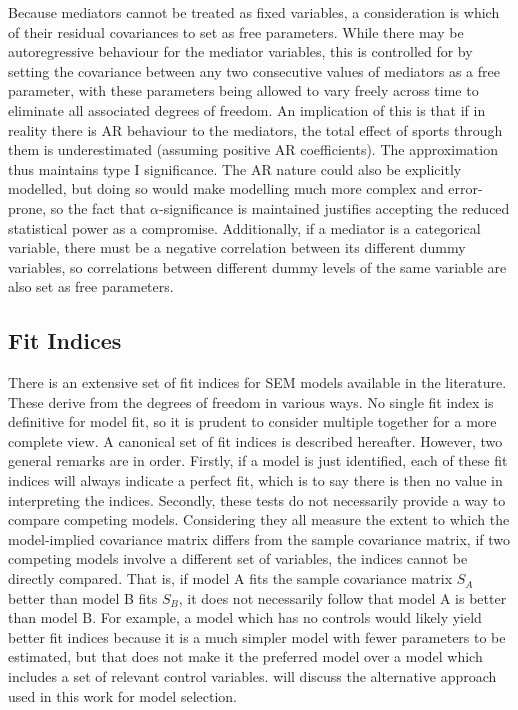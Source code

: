 Because mediators cannot be treated as fixed variables, a consideration is which of their residual covariances
to set as free parameters.
While there may be autoregressive behaviour for the mediator variables, this is controlled for by
setting the covariance between any two consecutive values of mediators as a free parameter, with these parameters
being allowed to vary freely across time to eliminate all associated degrees of freedom.
An implication of this is that if in reality there is AR behaviour to the mediators, the total
effect of sports through them is underestimated (assuming positive AR coefficients).
The approximation thus maintains type I significance.
The AR nature could also be explicitly modelled, but doing so would make modelling much more complex and error-prone,
so the fact that $\alpha$-significance is maintained justifies accepting the reduced statistical power as a compromise.
Additionally, if a mediator is a categorical variable, there must be a negative correlation between its different
dummy variables, so correlations between different dummy levels of the same variable are also set as free parameters.

\subsection{Fit Indices}
\label{sec:methods:fit_indices}
There is an extensive set of fit indices for SEM models available in the literature. These derive from the degrees of freedom
in various ways. No single fit index is definitive for model fit, so it is prudent to consider multiple together
for a more complete view. A canonical set of fit indices is described hereafter. However, two general remarks are in order.
Firstly, if a model is just identified, each of these fit indices will always indicate a perfect fit, which is to
say there is then no value in interpreting the indices.
Secondly, these tests do not necessarily provide a way to compare competing models. Considering they all measure the
extent to which the model-implied covariance matrix differs from the sample covariance matrix, if two competing models
involve a different set of variables, the indices cannot be directly compared. That is, if model A fits the sample
covariance matrix $S_A$ better than model B fits $S_B$, it does not necessarily follow that model A is better than model B.
For example, a model which has no controls would likely yield better fit indices because it is a much simpler model
with fewer parameters to be estimated,
but that does not make it the preferred model over a model which includes a set of relevant control variables.
 will discuss the alternative approach used in this work for model selection.

